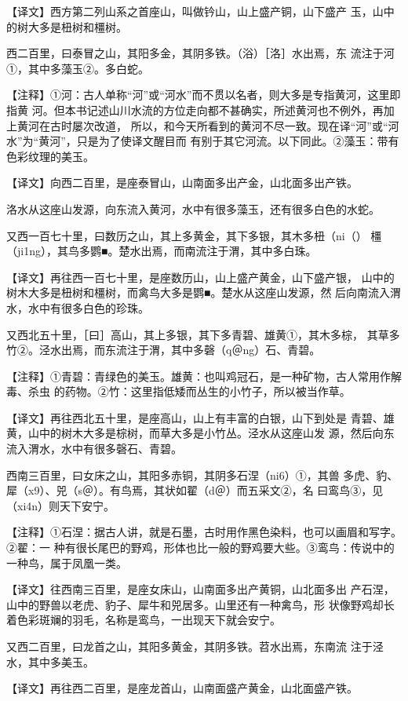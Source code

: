 \documentclass[a4paper,12pt,UTF8,twoside]{ctexbook}
\begin{document}
【译文】西方第二列山系之首座山，叫做钤山，山上盛产铜，山下盛产 玉，山中的树大多是杻树和橿树。

西二百里，曰泰冒之山，其阳多金，其阴多铁。（浴）［洛］水出焉，东 流注于河①，其中多藻玉②。多白蛇。

【注释】①河：古人单称“河”或“河水”而不贯以名者，则大多是专指黄河，这里即指黄 河。但本书记述山川水流的方位走向都不甚确实，所述黄河也不例外，再加上黄河在古时屡次改道， 所以，和今天所看到的黄河不尽一致。现在译“河”或“河水”为“黄河”，只是为了使译文醒目而 有别于其它河流。以下同此。②藻玉：带有色彩纹理的美玉。

【译文】向西二百里，是座泰冒山，山南面多出产金，山北面多出产铁。

洛水从这座山发源，向东流入黄河，水中有很多藻玉，还有很多白色的水蛇。

又西一百七十里，曰数历之山，其上多黄金，其下多银，其木多杻（ni（） 橿（ji1ng），其鸟多鹦■。楚水出焉，而南流注于渭，其中多白珠。

【译文】再往西一百七十里，是座数历山，山上盛产黄金，山下盛产银， 山中的树木大多是杻树和橿树，而禽鸟大多是鹦■。楚水从这座山发源，然 后向南流入渭水，水中有很多白色的珍珠。

又西北五十里，［曰］高山，其上多银，其下多青碧、雄黄①，其木多棕， 其草多竹②。泾水出焉，而东流注于渭，其中多磬（q＠ng）石、青碧。

【注释】①青碧：青绿色的美玉。雄黄：也叫鸡冠石，是一种矿物，古人常用作解毒、杀虫 的药物。②竹：这里指低矮而丛生的小竹子，所以被当作草。

【译文】再往西北五十里，是座高山，山上有丰富的白银，山下到处是 青碧、雄黄，山中的树木大多是棕树，而草大多是小竹丛。泾水从这座山发 源，然后向东流入渭水，水中有很多磬石、青碧。

西南三百里，曰女床之山，其阳多赤铜，其阴多石涅（ni6）①，其兽 多虎、豹、犀（x9）、兕（s＠）。有鸟焉，其状如翟（d＠）而五采文②，名 曰鸾鸟③，见（xi4n）则天下安宁。

【注释】①石涅：据古人讲，就是石墨，古时用作黑色染料，也可以画眉和写字。②翟：一 种有很长尾巴的野鸡，形体也比一般的野鸡要大些。③鸾鸟：传说中的一种鸟，属于凤凰一类。

【译文】往西南三百里，是座女床山，山南面多出产黄铜，山北面多出 产石涅，山中的野兽以老虎、豹子、犀牛和兕居多。山里还有一种禽鸟，形 状像野鸡却长着色彩斑斓的羽毛，名称是鸾鸟，一出现天下就会安宁。

又西二百里，曰龙首之山，其阳多黄金，其阴多铁。苕水出焉，东南流 注于泾水，其中多美玉。

【译文】再往西二百里，是座龙首山，山南面盛产黄金，山北面盛产铁。
\end{document}
